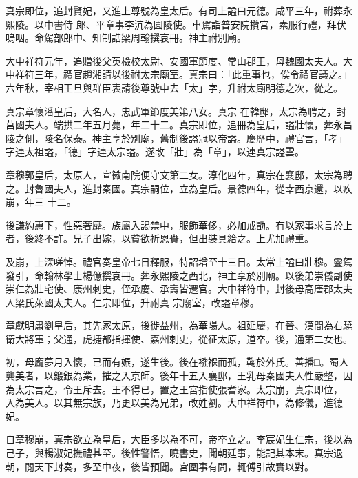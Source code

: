 \begin{pinyinscope}
 真宗即位，追封賢妃，又進上尊號為皇太后。有司上謚曰元德。咸平三年，祔葬永熙陵。以中書侍
 郎、平章事李沆為園陵使。車駕詣普安院攢宮，素服行禮，拜伏嗚咽。命駕部郎中、知制誥梁周翰撰哀冊。神主祔別廟。



 大中祥符元年，追贈後父英檢校太尉、安國軍節度、常山郡王，母魏國太夫人。大中祥符三年，禮官趙湘請以後祔太宗廟室。真宗曰：「此重事也，俟令禮官議之。」六年秋，宰相王旦與群臣表請後尊號中去「太」字，升祔太廟明德之次，從之。



 真宗章懷潘皇后，大名人，忠武軍節度美第八女。真宗
 在韓邸，太宗為聘之，封莒國夫人。端拱二年五月薨，年二十二。真宗即位，追冊為皇后，謚壯懷，葬永昌陵之側，陵名保泰。神主享於別廟，舊制後謚冠以帝謚。慶歷中，禮官言，「孝」字連太祖謚，「德」字連太宗謚。遂改「壯」為「章」，以連真宗謚雲。



 章穆郭皇后，太原人，宣徽南院便守文第二女。淳化四年，真宗在襄邸，太宗為聘之。封魯國夫人，進封秦國。真宗嗣位，立為皇后。景德四年，從幸西京還，以疾崩，年三
 十二。



 後謙約惠下，性惡奢靡。族屬入謁禁中，服飾華侈，必加戒勖。有以家事求言於上者，後終不許。兄子出嫁，以貧欲祈恩賚，但出裝具給之。上尤加禮重。



 及崩，上深嗟悼。禮官奏皇帝七日釋服，特詔增至十三日。太常上謚曰壯穆。靈駕發引，命翰林學士楊億撰哀冊。葬永熙陵之西北，神主享於別廟。以後弟崇儀副使崇仁為壯宅使、康州刺史，侄承慶、承壽皆遷官。大中祥符中，封後母高唐郡太夫人梁氏萊國太夫人。仁宗即位，升祔真
 宗廟室，改謚章穆。



 章獻明肅劉皇后，其先家太原，後徙益州，為華陽人。祖延慶，在晉、漢間為右驍衛大將軍；父通，虎捷都指揮使、嘉州刺史，從征太原，道卒。後，通第二女也。



 初，母龐夢月入懷，已而有娠，遂生後。後在襁褓而孤，鞠於外氏。善播□。蜀人龔美者，以鍛銀為業，摧之入京師。後年十五入襄邸，王乳母秦國夫人性嚴整，因為太宗言之，令王斥去。王不得已，置之王宮指使張耆家。太宗崩，真宗即位，
 入為美人。以其無宗族，乃更以美為兄弟，改姓劉。大中祥符中，為修儀，進德妃。



 自章穆崩，真宗欲立為皇后，大臣多以為不可，帝卒立之。李宸妃生仁宗，後以為己子，與楊淑妃撫禮甚至。後性警悟，曉書史，聞朝廷事，能記其本末。真宗退朝，閱天下封奏，多至中夜，後皆預聞。宮圍事有問，輒傅引故實以對。




\end{pinyinscope}
